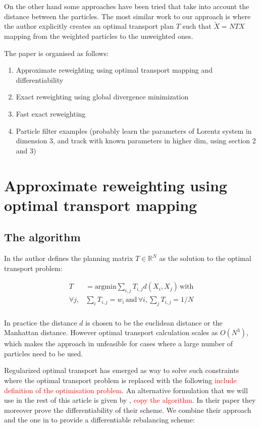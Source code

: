 \documentclass[%
reprint,
amsmath,amssymb,
aps,
]{revtex4-2}
\newcommand\todo[1]{\textcolor{red}{#1}}
\begin{document}
	On the other hand some approaches have been tried that take into account the distance between the particles. The most similar work to our approach is \cite{reich2012nonparametric} where the author explicitly creates an optimal transport plan $T$ such that $\tilde{X} = N T X$ mapping from the weighted particles to the unweighted ones.
	
	The paper is organised as follows:
	
	\begin{enumerate}
		\item Approximate reweighting using optimal transport mapping and differentiability
		\item Exact reweighting using global divergence minimization
		\item Fast exact reweighting
		\item Particle filter examples (probably learn the parameters of Lorentz system in dimension 3, and track with known parameters in higher dim, using section 2 and 3)
	\end{enumerate}
		

	\section{Approximate reweighting using optimal transport mapping}
	\label{sec:approximate}
		\subsection{The algorithm}
		In \cite{reich2012nonparametric} the author defines the planning matrix $T \in \mathbb{R}^N$
		as the solution to the optimal transport problem:
		
		\begin{align*}
			T &= \text{argmin}{\sum_{i, j} T_{i,j}  d(X_i,X_j)} \, \text{with} \\
			\forall j, & \sum_i T_{i, j} = w_i \, \text{and} \, \forall i, \sum_j T_{i, j} = 1/N
		\end{align*}
		\\
	
		In practice the distance $d$ is chosen to be the euclidean distance or the Manhattan distance.
		However optimal transport calculation scales as $O(N^3)$, which makes the approach in \cite{reich2012nonparametric} unfeasible for cases where a large number of particles need to be used.

		Regularized optimal transport has emerged as way to solve such constraints \cite{cuturi2013sinkhorn} where the optimal transport problem is replaced with the following \todo{include definition of the optimisation problem}. An alternative formulation that we will use in the rest of this article is given by \cite{feydy2018interpolating}, \todo{copy the algorithm}. In their paper they moreover prove the differentiability of their scheme.
		We combine their approach and the one in \cite{reich2012nonparametric} to provide a differentiable rebalancing scheme:
		
\end{document}
